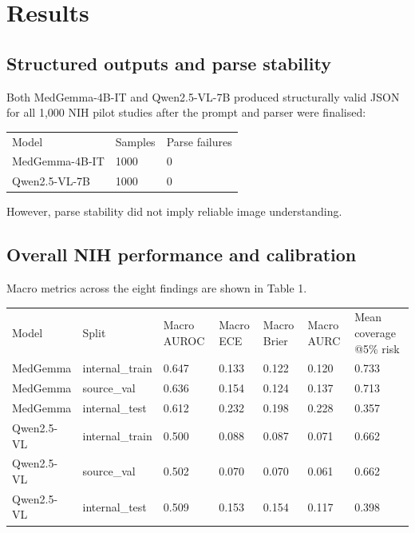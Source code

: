 \section{Results}

\subsection{Structured outputs and parse stability}

Both MedGemma-4B-IT and Qwen2.5-VL-7B produced structurally valid JSON for all 1,000 NIH pilot studies after the prompt and parser were finalised:

\begin{table}[t]
\centering
\small
\begin{tabular}{lll}
\hline
Model & Samples & Parse failures \\
MedGemma-4B-IT & 1000 & 0 \\
Qwen2.5-VL-7B & 1000 & 0 \\
\hline
\end{tabular}
\end{table}


However, parse stability did not imply reliable image understanding.

\subsection{Overall NIH performance and calibration}

Macro metrics across the eight findings are shown in Table 1.

\begin{table}[t]
\centering
\small
\begin{tabular}{lllllll}
\hline
Model & Split & Macro AUROC & Macro ECE & Macro Brier & Macro AURC & Mean coverage @5\% risk \\
MedGemma & internal\_train & 0.647 & 0.133 & 0.122 & 0.120 & 0.733 \\
MedGemma & source\_val & 0.636 & 0.154 & 0.124 & 0.137 & 0.713 \\
MedGemma & internal\_test & 0.612 & 0.232 & 0.198 & 0.228 & 0.357 \\
Qwen2.5-VL & internal\_train & 0.500 & 0.088 & 0.087 & 0.071 & 0.662 \\
Qwen2.5-VL & source\_val & 0.502 & 0.070 & 0.070 & 0.061 & 0.662 \\
Qwen2.5-VL & internal\_test & 0.509 & 0.153 & 0.154 & 0.117 & 0.398 \\
\hline
\end{tabular}
\end{table}


